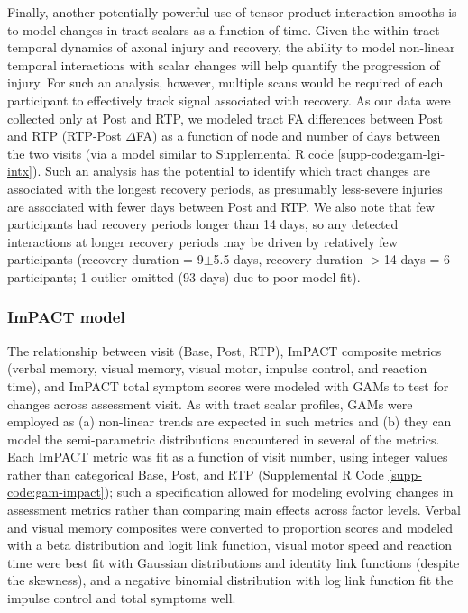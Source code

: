 \documentclass[12pt]{article}
\begin{document}
Finally, another potentially powerful use of tensor product interaction smooths is to model changes in tract scalars as a function of time. Given the within-tract temporal dynamics of axonal injury and recovery, the ability to model non-linear temporal interactions with scalar changes will help quantify the progression of injury. For such an analysis, however, multiple scans would be required of each participant to effectively track signal associated with recovery. As our data were collected only at Post and RTP, we modeled tract FA differences between Post and RTP (RTP-Post $\Delta$FA) as a function of node and number of days between the two visits (via a model similar to Supplemental R code \ref{supp-code:gam-lgi-intx}). Such an analysis has the potential to identify which tract changes are associated with the longest recovery periods, as presumably less-severe injuries are associated with fewer days between Post and RTP. We also note that few participants had recovery periods longer than 14 days, so any detected interactions at longer recovery periods may be driven by relatively few participants (recovery duration = 9$\pm$5.5 days, recovery duration $>$14 days = 6 participants; 1 outlier omitted (93 days) due to poor model fit).

\subsubsection{ImPACT model}
\label{sssec:meth-gam-impact}
The relationship between visit (Base, Post, RTP), ImPACT composite metrics (verbal memory, visual memory, visual motor, impulse control, and reaction time), and ImPACT total symptom scores were modeled with GAMs to test for changes across assessment visit. As with tract scalar profiles, GAMs were employed as (a) non-linear trends are expected in such metrics and (b) they can model the semi-parametric distributions encountered in several of the metrics. Each ImPACT metric was fit as a function of visit number, using integer values rather than categorical Base, Post, and RTP (Supplemental R Code \ref{supp-code:gam-impact}); such a specification allowed for modeling evolving changes in assessment metrics rather than comparing main effects across factor levels. Verbal and visual memory composites were converted to proportion scores and modeled with a beta distribution and logit link function, visual motor speed and reaction time were best fit with Gaussian distributions and identity link functions (despite the skewness), and a negative binomial distribution with log link function fit the impulse control and total symptoms well.
\end{document}
